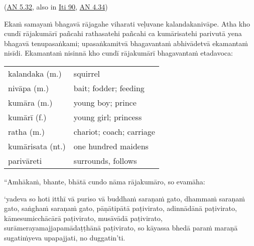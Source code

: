 \documentclass[11pt,oneside]{memoir}
\begin{document}
(\href{https://suttacentral.net/an5.32/en/sujato}{AN 5.32}, also in \href{https://suttacentral.net/iti90/en/thanissaro}{Iti 90}, \href{https://suttacentral.net/an4.34/en/sujato}{AN 4.34})

\begin{spacedquote}
Ekaṁ samayaṁ bhagavā rājagahe viharati veḷuvane kalandakanivāpe. Atha kho cundī
rājakumārī pañcahi rathasatehi pañcahi ca kumārisatehi parivutā yena bhagavā
tenupasaṅkami; upasaṅkamitvā bhagavantaṁ abhivādetvā ekamantaṁ nisīdi. Ekamantaṁ
nisinnā kho cundī rājakumārī bhagavantaṁ etadavoca:
\end{spacedquote}

\begin{longtable}{L{\colOne} L{\colTwo}}
kalandaka (m.) & squirrel\\[0pt]
nivāpa (m.) & bait; fodder; feeding\\[0pt]
kumāra (m.) & young boy; prince\\[0pt]
kumārī (f.) & young girl; princess\\[0pt]
ratha (m.) & chariot; coach; carriage\\[0pt]
kumārisata (nt.) & one hundred maidens\\[0pt]
parivāreti & surrounds, follows\\[0pt]
\end{longtable}

\begin{spacedquote}
“Amhākaṁ, bhante, bhātā cundo nāma rājakumāro, so evamāha:

‘yadeva so hoti itthī vā puriso vā
buddhaṁ saraṇaṁ gato, dhammaṁ saraṇaṁ gato, saṅghaṁ saraṇaṁ gato,
pāṇātipātā paṭivirato, adinnādānā paṭivirato, kāmesumicchācārā paṭivirato,
musāvādā paṭivirato, surāmerayamajjapamādaṭṭhānā paṭivirato,
so kāyassa bhedā paraṁ maraṇā sugatiṁyeva upapajjati, no duggatin’ti.
\end{spacedquote}

\enlargethispage{2\baselineskip}
\end{document}
